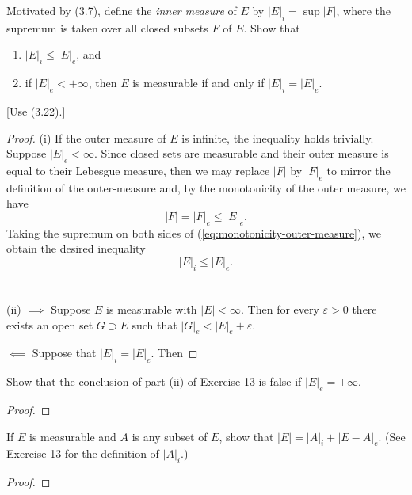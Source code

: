 \begin{problem}
Motivated by (3.7), define the \emph{inner measure} of $E$ by
$\left|E\right|_i=\sup\left|F\right|$, where the supremum is taken over all
closed subsets $F$ of $E$. Show that
\begin{enumerate}[label=(\roman*)]
\item $\left|E\right|_i\leq\left|E\right|_e$, and
\item if $\left|E\right|_e<+\infty$, then $E$ is measurable if and only if
  $\left|E\right|_i=\left|E\right|_e$.
\end{enumerate}
[Use (3.22).]
\end{problem}
\begin{proof}
(i) If the outer measure of $E$ is infinite, the inequality holds
trivially. Suppose $|E|_e<\infty$. Since closed sets are measurable and
their outer measure is equal to their Lebesgue measure, then we may replace
$\left|F\right|$ by $\left|F\right|_e$ to mirror the definition of the
outer-measure and, by the monotonicity of the outer measure, we have
\begin{equation}
\label{eq:monotonicity-outer-measure}
\left|F\right|=\left|F\right|_e\leq\left|E\right|_e.
\end{equation}
Taking the supremum on both sides of (\ref{eq:monotonicity-outer-measure}),
we obtain the desired inequality
\begin{equation}
\label{eq:inner-outer-measure}
\left|E\right|_i\leq\left|E\right|_e.
\end{equation}
\\\\
(ii) $\implies$ Suppose $E$ is measurable with
$\left|E\right|<\infty$. Then for every $\varepsilon>0$ there exists an
open set $G\supset E$ such that
$\left|G\right|_e<\left|E\right|_e+\varepsilon$.

$\impliedby$ Suppose that $\left|E\right|_i=\left|E\right|_e$. Then
\end{proof}
\newpage

\begin{problem}
  Show that the conclusion of part (ii) of Exercise 13 is false if
  $\left|E\right|_e=+\infty$.
\end{problem}
\begin{proof}
\end{proof}
\newpage


\begin{problem}
If $E$ is measurable and $A$ is any subset of $E$, show that
$\left|E\right|=\left|A\right|_i+\left|E-A\right|_e$. (See Exercise 13 for
the definition of $\left|A\right|_i$.)
\end{problem}
\begin{proof}
\end{proof}

